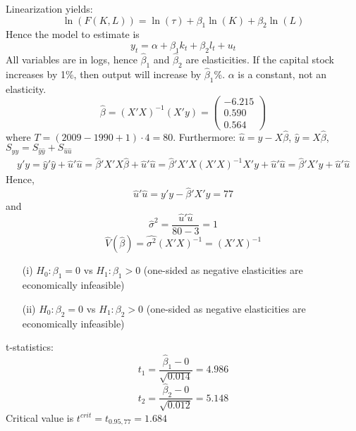 \documentclass{article}
\begin{document}
\begin{Answer}
\Question
Linearization yields: $$\ln(F(K,L)) = \ln(\tau) + \beta_1 \ln(K) + \beta_2 \ln(L)$$
Hence the model to estimate is
$$y_t = \alpha + \beta_1 k_t + \beta_2 l_t + u_t$$
\Question
All variables are in logs, hence $\hat{\beta}_1$ and $\hat{\beta}_2$ are elasticities. If the capital stock increases by 1\%, then output will increase by $\hat{\beta}_1$\%. $\alpha$ is a constant, not an elasticity.
\Question
$$\hat{\beta} = (X'X)^{-1}(X'y) = \begin{pmatrix}-6.215\\0.590\\0.564\end{pmatrix}$$ where $T=(2009-1990+1)\cdot 4 = 80$. Furthermore: $\hat{u}=y-X\hat{\beta}$, $\hat{y}=X\hat{\beta}$, $S_{yy}=S_{\hat{y}\hat{y}} +S_{\hat{u}\hat{u}}$
\begin{align*}
y'y = \hat{y}'\hat{y}+\hat{u}'\hat{u} = \hat{\beta}'X'X\hat{\beta} + \hat{u}'\hat{u} =\hat{\beta}'X'X(X'X)^{-1}X'y + \hat{u}'\hat{u} = \hat{\beta}'X'y + \hat{u}'\hat{u}
\end{align*}
Hence, $$\hat{u}'\hat{u} = y'y - \hat{\beta}'X'y = 77$$
and $$\hat{\sigma}^2 = \frac{\hat{u}'\hat{u}}{80-3}=1$$
$$\hat{V}(\hat{\beta})=\hat{\sigma^2}(X'X)^{-1} = (X'X)^{-1}$$
\begin{itemize}
	\item[(i)] $H_0:\beta_1=0$ vs $H_1:\beta_1 >0$ (one-sided as negative elasticities are economically infeasible)
	\item[(ii)] $H_0:\beta_2=0$ vs $H_1:\beta_2 >0$ (one-sided as negative elasticities are economically infeasible)
\end{itemize}
t-statistics: 
$$t_1 = \frac{\hat{\beta}_1-0}{\sqrt{0.014}}=4.986$$ 
$$t_2 = \frac{\hat{\beta}_2-0}{\sqrt{0.012}}=5.148$$
Critical value is $t^{crit} = t_{0.95,77} = 1.684$


\end{Answer}
\end{document}

